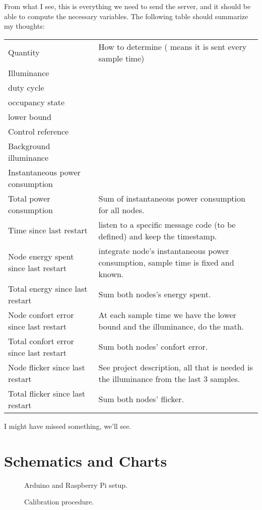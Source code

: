 \documentclass[english,fira]{ist-report}
\begin{document}
From what I see, this is everything we need to send the server, and it should be able to compute the necessary variables. The following table should summarize my thoughts:
\begin{table}[h]
	\centering
	\begin{tabularx}{\linewidth}{l|X}
		Quantity & How to determine (\ccheckmark{} means it is sent every sample time) \\
		Illuminance & \ccheckmark{} \\
		duty cycle  & \ccheckmark{} \\
		occupancy state & \ccheckmark{} \\
		lower bound & \ccheckmark{} \\
		Control reference & \ccheckmark{} \\
		Background illuminance & \ccheckmark{} \\
		Instantaneous power consumption & \ccheckmark{} \\
		Total power consumption & Sum of instantaneous power consumption for all nodes. \\
		Time since last restart & listen to a specific message code (to be defined) and keep the timestamp. \\
		Node energy spent since last restart & integrate node's instantaneous power consumption, sample time is fixed and known. \\
		Total energy since last restart & Sum both nodes's energy spent. \\
		Node confort error since last restart & At each sample time we have the lower bound and the illuminance, do the math. \\
		Total confort error since last restart & Sum both nodes' confort error. \\
		Node flicker since last restart & See project description, all that is needed is the illuminance from the last 3 samples. \\
		Total flicker since last restart & Sum both nodes' flicker.
	\end{tabularx}
\end{table}

I might have missed something, we'll see.

\section{Schematics and Charts}

\begin{figure}[ht]
	\centering
	
	\caption{Arduino and Raspberry Pi setup.}
\end{figure}

\begin{figure}[ht]
	\centering
	
	\caption{Calibration procedure.}
	\label{fig:calib}
\end{figure}

\pagebreak
\printbibliography

\listoftodos
\end{document}
